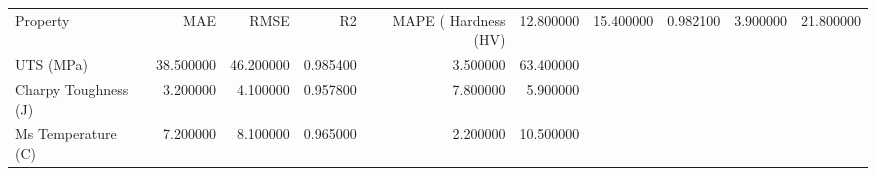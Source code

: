 \begin{tabular}{lrrrrr}
\toprule
Property & MAE & RMSE & R2 & MAPE (%
\midrule
Hardness (HV) & 12.800000 & 15.400000 & 0.982100 & 3.900000 & 21.800000 \\
UTS (MPa) & 38.500000 & 46.200000 & 0.985400 & 3.500000 & 63.400000 \\
Charpy Toughness (J) & 3.200000 & 4.100000 & 0.957800 & 7.800000 & 5.900000 \\
Ms Temperature (C) & 7.200000 & 8.100000 & 0.965000 & 2.200000 & 10.500000 \\
\bottomrule
\end{tabular}
